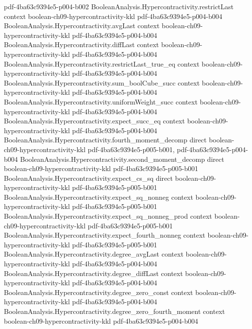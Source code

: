\begin{lemma}
  {pdf-4ba63c9394e5-p004-b002}
\proofstep
  {BooleanAnalysis.Hypercontractivity.restrictLast}
  {context}
  {boolean-ch09-hypercontractivity-kkl}
  {pdf-4ba63c9394e5-p004-b004}
\proofstep
  {BooleanAnalysis.Hypercontractivity.avgLast}
  {context}
  {boolean-ch09-hypercontractivity-kkl}
  {pdf-4ba63c9394e5-p004-b004}
\proofstep
  {BooleanAnalysis.Hypercontractivity.diffLast}
  {context}
  {boolean-ch09-hypercontractivity-kkl}
  {pdf-4ba63c9394e5-p004-b004}
\proofstep
  {BooleanAnalysis.Hypercontractivity.restrictLast_true_eq}
  {context}
  {boolean-ch09-hypercontractivity-kkl}
  {pdf-4ba63c9394e5-p004-b004}
\proofstep
  {BooleanAnalysis.Hypercontractivity.sum_boolCube_succ}
  {context}
  {boolean-ch09-hypercontractivity-kkl}
  {pdf-4ba63c9394e5-p004-b004}
\proofstep
  {BooleanAnalysis.Hypercontractivity.uniformWeight_succ}
  {context}
  {boolean-ch09-hypercontractivity-kkl}
  {pdf-4ba63c9394e5-p004-b004}
\proofstep
  {BooleanAnalysis.Hypercontractivity.expect_succ_eq}
  {context}
  {boolean-ch09-hypercontractivity-kkl}
  {pdf-4ba63c9394e5-p004-b004}
\proofstep
  {BooleanAnalysis.Hypercontractivity.fourth_moment_decomp}
  {direct}
  {boolean-ch09-hypercontractivity-kkl}
  {pdf-4ba63c9394e5-p005-b001,
    pdf-4ba63c9394e5-p004-b004}
\proofstep
  {BooleanAnalysis.Hypercontractivity.second_moment_decomp}
  {direct}
  {boolean-ch09-hypercontractivity-kkl}
  {pdf-4ba63c9394e5-p005-b001}
\proofstep
  {BooleanAnalysis.Hypercontractivity.expect_cs_sq}
  {direct}
  {boolean-ch09-hypercontractivity-kkl}
  {pdf-4ba63c9394e5-p005-b001}
\proofstep
  {BooleanAnalysis.Hypercontractivity.expect_sq_nonneg}
  {context}
  {boolean-ch09-hypercontractivity-kkl}
  {pdf-4ba63c9394e5-p005-b001}
\proofstep
  {BooleanAnalysis.Hypercontractivity.expect_sq_nonneg_prod}
  {context}
  {boolean-ch09-hypercontractivity-kkl}
  {pdf-4ba63c9394e5-p005-b001}
\proofstep
  {BooleanAnalysis.Hypercontractivity.expect_fourth_nonneg}
  {context}
  {boolean-ch09-hypercontractivity-kkl}
  {pdf-4ba63c9394e5-p005-b001}
\proofstep
  {BooleanAnalysis.Hypercontractivity.degree_avgLast}
  {context}
  {boolean-ch09-hypercontractivity-kkl}
  {pdf-4ba63c9394e5-p004-b004}
\proofstep
  {BooleanAnalysis.Hypercontractivity.degree_diffLast}
  {context}
  {boolean-ch09-hypercontractivity-kkl}
  {pdf-4ba63c9394e5-p004-b004}
\proofstep
  {BooleanAnalysis.Hypercontractivity.degree_zero_const}
  {context}
  {boolean-ch09-hypercontractivity-kkl}
  {pdf-4ba63c9394e5-p004-b004}
\proofstep
  {BooleanAnalysis.Hypercontractivity.degree_zero_fourth_moment}
  {context}
  {boolean-ch09-hypercontractivity-kkl}
  {pdf-4ba63c9394e5-p004-b004}

\end{lemma}
